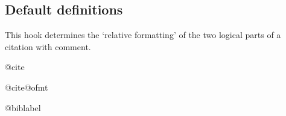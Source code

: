  \subsection{Default definitions}

    This hook determines the `relative formatting' of the two logical
    parts of a citation with comment.
    
\begin{docCommand}{@cite}{}
       \begin{teX}
\def\@cite#1#2{[{#1\if@tempswa , #2\fi}]}
       \end{teX}
  \end{docCommand}
%
 \begin{docCommand}{@cite@ofmt}{}
       \begin{teX}
\let\@cite@ofmt\hbox
       \end{teX}
  \end{docCommand}

 \begin{docCommand}{@biblabel}{}
       \begin{teX}
\def\@biblabel#1{[#1]}
       \end{teX}
  \end{docCommand}
